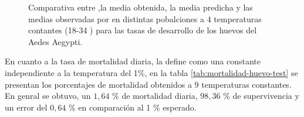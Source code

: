 \begin{figure}
\begin{minipage}{\textwidth}
    \caption{\label{fig:desarrollo-huevo-baserra2006}
    Comparativa entre ,la media obtenida, la media predicha y las medias observadas por \cite{
    BESERRA2006} en distintas pobalciones a 4 temperaturas contantes (18-34 \textcelsius) para
    las tasas de desarrollo de los huevos del Aedes Aegypti.}


\end{minipage}
\end{figure}

En cuanto a la tasa de mortalidad diaria, \cite{otero2006stochastic} la define como una constante
independiente a la temperatura del 1\%, en la tabla \ref{tab:mortalidad-huevo-test} se presentan
los porcentajes de mortalidad obtenidos a 9 temperaturas constantes. En genral se obtuvo, un $1,64$
\% de mortalidad diaria, $98,36$ \% de supervivencia y un error del $0,64$ \% en comparación al 1
\% esperado.

